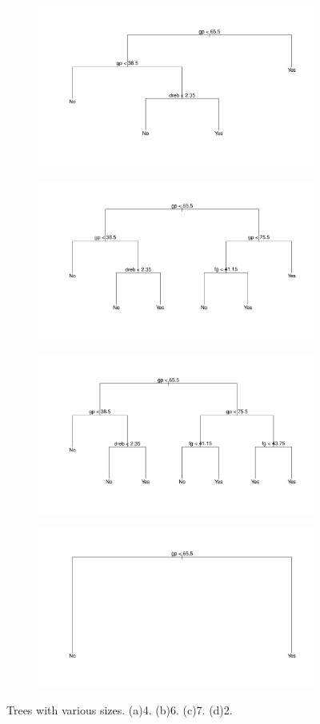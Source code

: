 \begin{figure}[H]
	\centering
	\begin{subfigure}{.5\textwidth}
		\centering
		\includegraphics[width=0.6\linewidth]{ImageFiles/Classification/Trees/tree_size_4.pdf}
		\caption{}
		\label{fig:tree_size_4}
	\end{subfigure}%
	\begin{subfigure}{.5\textwidth}
		\centering
		\includegraphics[width=0.6\linewidth]{ImageFiles/Classification/Trees/tree_size_6.pdf}
		\caption{}
		\label{fig:tree_size_6}
	\end{subfigure}
	\begin{subfigure}{.5\textwidth}
		\centering
		\includegraphics[width=0.6\linewidth]{ImageFiles/Classification/Trees/tree_size_7.pdf}
		\caption{}
		\label{fig:tree_size_7}
	\end{subfigure}%
	\begin{subfigure}{.5\textwidth}
		\centering
		\includegraphics[width=0.6\linewidth]{ImageFiles/Classification/Trees/tree_size_2.pdf}
		\caption{}
		\label{fig:tree_size_2}
	\end{subfigure}
	\caption{Trees with various sizes. (a)4. (b)6. (c)7. (d)2.}
	\label{fig:trees_size}
\end{figure}


